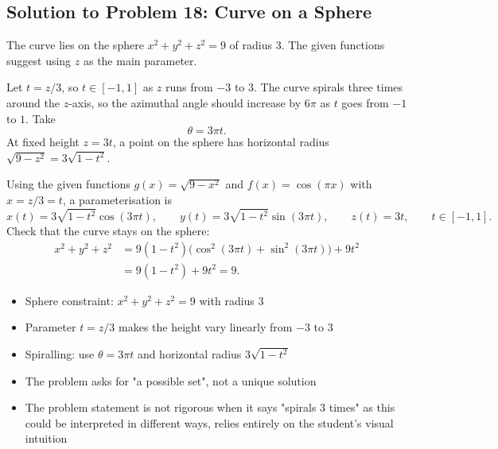 \subsection{Solution to Problem 18: Curve on a Sphere}

\begin{solution}
The curve lies on the sphere $x^2 + y^2 + z^2 = 9$ of radius $3$. The given functions suggest using $z$ as the main parameter.

Let $t = z/3$, so $t \in [-1,1]$ as $z$ runs from $-3$ to $3$. The curve spirals three times around the $z$-axis, so the azimuthal angle should increase by $6\pi$ as $t$ goes from $-1$ to $1$. Take
\[
\theta = 3\pi t.
\]
At fixed height $z = 3t$, a point on the sphere has horizontal radius $\sqrt{9-z^2} = 3\sqrt{1-t^2}$.

Using the given functions $g(x)=\sqrt{9-x^2}$ and $f(x)=\cos(\pi x)$ with $x = z/3 = t$, a parameterisation is
\[
x(t) = 3\sqrt{1-t^2}\cos(3\pi t), \qquad
y(t) = 3\sqrt{1-t^2}\sin(3\pi t), \qquad
z(t) = 3t,
\qquad t \in [-1,1].
\]
Check that the curve stays on the sphere:
\begin{align*}
x^2 + y^2 + z^2
&= 9(1-t^2)\bigl(\cos^2(3\pi t)+\sin^2(3\pi t)\bigr) + 9t^2 \\
&= 9(1-t^2) + 9t^2 = 9.
\end{align*}
\end{solution}

\begin{takeaways}
\begin{itemize}
    \item Sphere constraint: $x^2+y^2+z^2=9$ with radius $3$
    \item Parameter $t=z/3$ makes the height vary linearly from $-3$ to $3$
    \item Spiralling: use $\theta=3\pi t$ and horizontal radius $3\sqrt{1-t^2}$
    \item The problem asks for "a possible set", not a unique solution
    \item The problem statement is not rigorous when it says "spirals 3 times" as this could be interpreted in different ways, relies entirely on the student's visual intuition
\end{itemize}
\end{takeaways}

